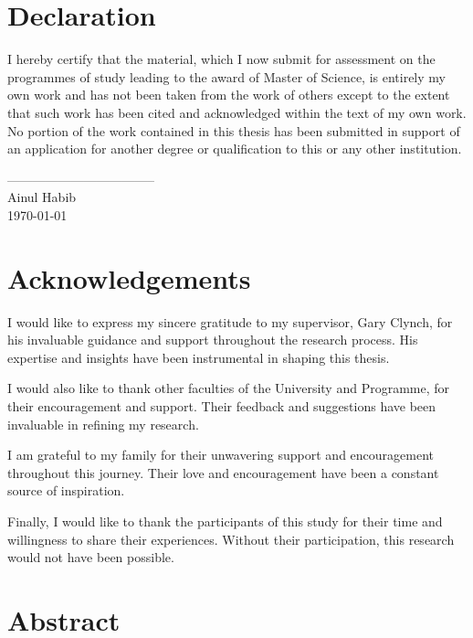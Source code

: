 \documentclass{article}
\begin{document}
\section*{Declaration}
\begin{flushleft}
I hereby certify that the material, which I now submit for assessment on the programmes of study leading to the award of Master of Science, is entirely my own work and has not been taken from the work of others except to the extent that such work has been cited and acknowledged within the text of my own work. No portion of the work contained in this thesis has been submitted in support of an application for another degree or qualification to this or any other institution.
\end{flushleft}
\vspace{2cm}
\begin{flushright}
-----------------------------------\\
Ainul Habib\\
\today
\end{flushright}
\pagebreak

\section*{Acknowledgements}
 
 I would like to express my sincere gratitude to my supervisor, Gary Clynch, for his invaluable guidance and support throughout the research process. His expertise and insights have been instrumental in shaping this thesis.

I would also like to thank other faculties of the University and Programme, for their encouragement and support. Their feedback and suggestions have been invaluable in refining my research.

I am grateful to my family for their unwavering support and encouragement throughout this journey. Their love and encouragement have been a constant source of inspiration.

Finally, I would like to thank the participants of this study for their time and willingness to share their experiences. Without their participation, this research would not have been possible.
\pagebreak

\listoffigures
\pagebreak
 


\tableofcontents
\pagebreak

\section*{Abstract}
\end{document}
